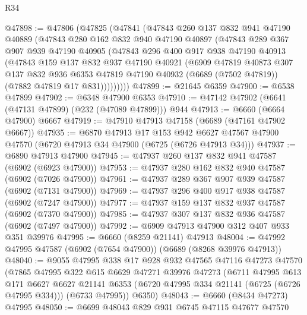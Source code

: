 \begin{lexlean}{R34}
\begin{coremodule}
@47898 := @47806
    (@47825
      (@47841
        (@47843
          @260
          @137
          @832
          @941
          @47190
          @40889
          (@47843
            @280
            @162
            @832
            @940
            @47190
            @40897
            (@47843
              @289
              @367
              @907
              @939
              @47190
              @40905
              (@47843
                @296
                @400
                @917
                @938
                @47190
                @40913
                (@47843
                  @159
                  @137
                  @832
                  @937
                  @47190
                  @40921
                  (@6909
                    @47819
                    @40873
                    @307
                    @137
                    @832
                    @936
                    @6353
                    @47819
                    @47190
                    @40932
                    (@6689 (@7502 @47819))
                    (@7882 @47819 @17 @831)))))))))
@47899 := @21645 @6359
@47900 := @6538 @47899
@47902 := @6348 @47900 @6353
@47910 := @47142 @47902 (@6641 (@47131 @47899) (@232 (@47089 @47899))) @944
@47913 := @6660 (@6664 @47900) @6667
@47919 := @47910 @47913 @47158 (@6689 (@47161 @47902 @6667))
@47935 := @6870
    @47913
    @17
    @153
    @942
    @6627
    @47567
    @47900
    @47570
    (@6720 @47913 @34 @47900 (@6725 (@6726 @47913 @34)))
@47937 := @6890 @47913 @47900
@47945 := @47937 @260 @137 @832 @941 @47587 (@6902 (@6923 @47900))
@47953 := @47937 @280 @162 @832 @940 @47587 (@6902 (@7026 @47900))
@47961 := @47937 @289 @367 @907 @939 @47587 (@6902 (@7131 @47900))
@47969 := @47937 @296 @400 @917 @938 @47587 (@6902 (@7247 @47900))
@47977 := @47937 @159 @137 @832 @937 @47587 (@6902 (@7370 @47900))
@47985 := @47937 @307 @137 @832 @936 @47587 (@6902 (@7497 @47900))
@47992 := @6909 @47913 @47900 @312 @407 @933 @351 @39976
@47995 := @6660 (@8259 @21141) @47913
@48004 := @47992 @47995 @47587 (@6902 (@7654 @47900)) (@6689 (@8268 @39976 @47913))
@48040 := @9055
    @47995
    @338
    @17
    @928
    @932
    @47565
    @47116
    @47273
    @47570
    (@7865
      @47995
      @322
      @615
      @6629
      @47271
      @39976
      @47273
      (@6711
        @47995
        @613
        @171
        @6627
        @6627
        @21141
        @6353
        (@6720 @47995 @334 @21141 (@6725 (@6726 @47995 @334)))
        (@6733 @47995))
      @6350)
@48043 := @6660 (@8434 @47273) @47995
@48050 := @6699 @48043 @829 @931 @6745 @47115 @47677 @47570

\end{coremodule}
\end{lexlean}
